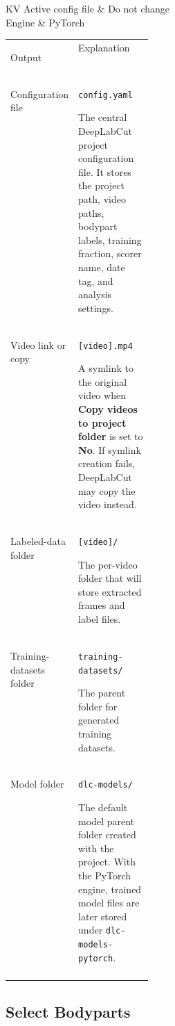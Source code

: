 \documentclass[11pt]{article}
\newif\ifalmaoutputtable
\newcommand{\boxedtoprule}{%
  \ifalmaoutputtable
    \arrayrulecolor{calloutOutputFrame}\hline\rowcolor{calloutOutputHeader}%
  \else
    \arrayrulecolor{almaBlue!62}\hline\rowcolor{almaSky!78}%
  \fi
}
\newcommand{\boxedmidrule}{%
  \ifalmaoutputtable
    \arrayrulecolor{calloutOutputFrame}\hline
  \else
    \arrayrulecolor{calloutDataFrame}\hline
  \fi
}
\newcommand{\boxedbottomrule}{%
  \ifalmaoutputtable
    \arrayrulecolor{calloutOutputFrame}\hline
  \else
    \arrayrulecolor{almaBlue!62}\hline
  \fi
}
\renewcommand{\[}{%
  \par\smallskip\noindent
  \begin{center}%
  \setlength{\fboxsep}{5pt}%
  \setlength{\fboxrule}{0.35pt}%
  \begin{lrbox}{\almaEquationBox}%
  $\displaystyle
}
\renewcommand{\]}{%
  $%
  \end{lrbox}%
  \fcolorbox{equationLine}{equationBack}{\usebox{\almaEquationBox}}%
  \end{center}%
  \smallskip\par
}
\begin{document}
\begin{tcolorbox}[software settings,title=\textbf{Manage Project: Recommended Settings}]
\begin{tabularx}{\linewidth}{KV}
Active config file & Do not change \\
Engine & PyTorch \\
\end{tabularx}
\end{tcolorbox}


\begin{tcolorbox}[output file box,title=\textbf{Create Project Output Files}]
\begin{tabularx}{\linewidth}{
>{\bfseries\raggedright\arraybackslash}p{0.24\linewidth}|
>{\raggedright\arraybackslash}X
}
\boxedtoprule
Output & Explanation \\
\boxedmidrule
Configuration file & \texttt{config.yaml}\par
The central DeepLabCut project configuration file. It stores the project path, video paths, bodypart labels, training fraction, scorer name, date tag, and analysis settings. \\
Video link or copy & \texttt{[video].mp4}\par
A symlink to the original video when \textbf{Copy videos to project folder} is set to \textbf{No}. If symlink creation fails, DeepLabCut may copy the video instead. \\
Labeled-data folder & \texttt{[video]/}\par
The per-video folder that will store extracted frames and label files. \\
Training-datasets folder & \texttt{training-datasets/}\par
The parent folder for generated training datasets. \\
Model folder & \texttt{dlc-models/}\par
The default model parent folder created with the project. With the PyTorch engine, trained model files are later stored under \texttt{dlc-models-pytorch}. \\
\boxedbottomrule
\end{tabularx}
\end{tcolorbox}


\subsection{Select Bodyparts}\label{sec:select-bodyparts}
\end{document}
